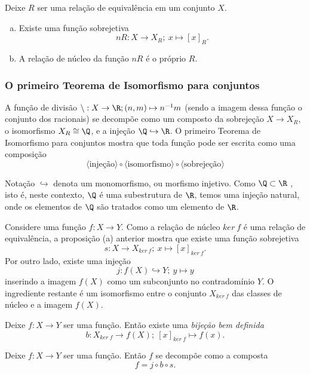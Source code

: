         \begin{stat}
            Deixe $R$ ser uma relação de equivalência em um conjunto $X$.
            \begin{enumerate}[(a)]
               \item Existe uma função sobrejetiva $$nR: X\to X_{R};\ x\mapsto \left[x\right]_{R}.$$
               \item A relação de núcleo da função $nR$ é o próprio $R$.
            \end{enumerate}
         \end{stat}
      \newpage

      \subsubsection{O primeiro Teorema de Isomorfismo para conjuntos}
         A função de divisão $\setminus: X\to \R; (n,m) \mapsto n^{-1}m$ (sendo a imagem dessa função o conjunto dos racionais) se decompõe como um composto da sobrejeção $X \to X_{R}$, o isomorfismo $X_{R} \cong \Q$, e a injeção $\Q \hookrightarrow \R$. O primeiro Teorema de Isomorfismo para conjuntos mostra que toda função pode ser escrita como uma composição $$\langle \textrm{injeção} \rangle \circ \langle \textrm{isomorfismo} \rangle \circ \langle \textrm{sobrejeção} \rangle $$
         \begin{mymdframed}{Notação}
            $\hookrightarrow$ denota um monomorfismo, ou morfismo injetivo. Como $\Q \subset \R$ , isto é, neste contexto, $\Q$ é uma subestrutura de $\R$, temos uma injeção natural, onde os elementos de $\Q$ são tratados como um elemento de $\R$.
         \end{mymdframed}
         Considere uma função $f: X\to Y$. Como a relação de núcleo $ker\ f$ é uma relação de equivalência, a proposição (a) anterior mostra que existe uma função sobrejetiva $$s: X\to X_{ker\ f};\ x\mapsto \left[x\right]_{ker\ f}.$$
         Por outro lado, existe uma injeção $$j: f(X) \hookrightarrow Y;\ y\mapsto y$$ inserindo a imagem $f(X)$ como um subconjunto no contradomínio $Y$.
         O ingrediente restante é um isomorfismo entre o conjunto $X_{ker\ f}$ das classes de núcleo e a imagem $f(X)$.

         \begin{stat}
            Deixe $f: X\to Y$ ser uma função. Então existe uma \emph{bijeção bem definida} $$ b: X_{ker\ f} \to f(X);\ \left[x\right]_{ker\ f} \mapsto f(x).$$
         \end{stat}
         \begin{theorem}
            Deixe $f: X\to Y$ ser uma função. Então $f$ se decompõe como a composta $$f = j\circ b \circ s.$$ 
         \end{theorem}

